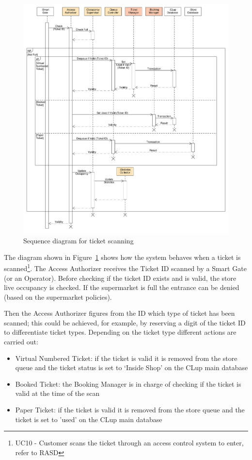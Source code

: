 \begin{figure}[H]
    \includegraphics[width=1.1\textwidth]{Images/UML_ticket_scan_sequence.pdf}
    \caption{\label{fig:UML_ticket_scan_sequence}Sequence diagram for ticket scanning}
\end{figure}
The diagram shown in Figure~\ref{fig:UML_ticket_scan_sequence} shows how the system behaves when a ticket is scanned\footnote{UC10 - Customer scans the ticket through an access control system to enter, refer to RASD}. The Access Authorizer receives the Ticket ID scanned by a Smart Gate (or an Operator). Before checking if the ticket ID exists and is valid, the store live occupancy is checked. If the supermarket is full the entrance can be denied (based on the supermarket policies). 

Then the Access Authorizer figures from the ID which type of ticket has been scanned; this could be achieved, for example, by reserving a digit of the ticket ID to differentiate ticket types.
Depending on the ticket type different actions are carried out:
\begin{itemize}
    \item Virtual Numbered Ticket: if the ticket is valid it is removed from the store queue and the ticket status is set to `Inside Shop' on the CLup main database
    \item Booked Ticket: the Booking Manager is in charge of checking if the ticket is valid at the time of the scan
    \item Paper Ticket: if the ticket is valid it is removed from the store queue and the ticket is set to 'used' on the CLup main database
\end{itemize}

